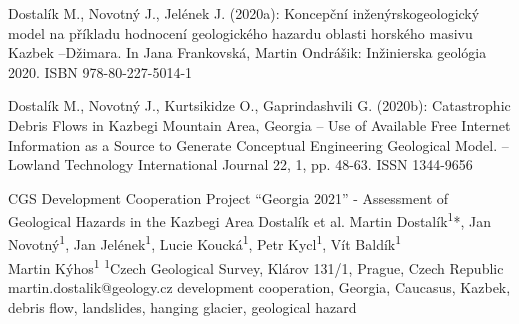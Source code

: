 {Dostalík M., Novotný J., Jelének J. (2020a): Koncepční inženýrskogeologický model na příkladu hodnocení geologického hazardu oblasti horského masivu Kazbek –Džimara. In Jana Frankovská, Martin Ondrášik: Inžinierska geológia 2020. ISBN 978-80-227-5014-1

Dostalík M., Novotný J., Kurtsikidze O., Gaprindashvili G. (2020b): Catastrophic Debris Flows in Kazbegi Mountain Area, Georgia – Use of Available Free Internet Information as a Source to Generate Conceptual Engineering Geological Model. – Lowland Technology International Journal 22, 1, pp. 48-63. ISSN 1344-9656
}


\abstract
{CGS Development Cooperation Project \enquote{Georgia 2021} - Assessment of Geological Hazards in the Kazbegi Area} 
{Dostalík et al.} 
{Martin Dostalík\textsuperscript{1}*, Jan Novotný\textsuperscript{1}, Jan Jelének\textsuperscript{1}, Lucie Koucká\textsuperscript{1}, Petr Kycl\textsuperscript{1}, Vít Baldík\textsuperscript{1}\\ Martin Kýhos\textsuperscript{1}} 
{\POtag} 
{
\textsuperscript{1}Czech Geological Survey, Klárov 131/1, Prague, Czech Republic
}
{martin.dostalik@geology.cz}  %
{development cooperation, Georgia, Caucasus, Kazbek, debris flow, landslides, hanging glacier, geological hazard}
